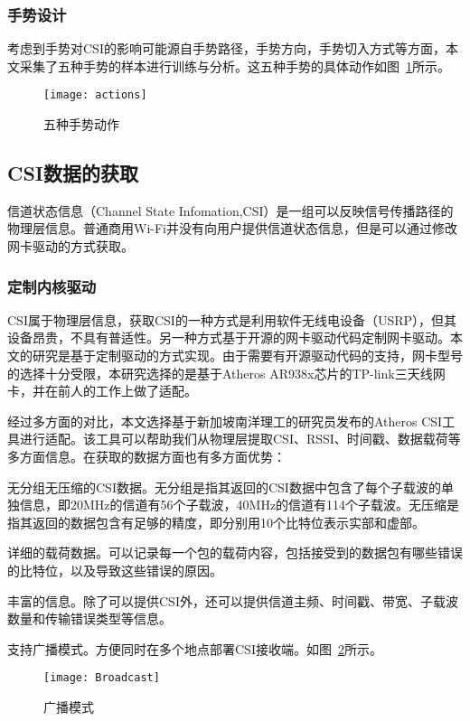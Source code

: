 \subsubsection{手势设计}

考虑到手势对CSI的影响可能源自手势路径，手势方向，手势切入方式等方面，本文采集了五种手势的样本进行训练与分析。这五种手势的具体动作如图~\ref{fig:actions}所示。

\begin{figure}[htbp] %
  \centering
  \texttt{[image: actions]}
  \caption{五种手势动作}
  \label{fig:actions}
\end{figure}

 \subsection{CSI数据的获取}
信道状态信息（Channel State Infomation,CSI）是一组可以反映信号传播路径的物理层信息。普通商用Wi-Fi并没有向用户提供信道状态信息，但是可以通过修改网卡驱动的方式获取。

 \subsubsection{定制内核驱动}
CSI属于物理层信息，获取CSI的一种方式是利用软件无线电设备（USRP），但其设备昂贵，不具有普适性。另一种方式基于开源的网卡驱动代码定制网卡驱动。本文的研究是基于定制驱动的方式实现。由于需要有开源驱动代码的支持，网卡型号的选择十分受限，本研究选择的是基于Atheros AR938x芯片的TP-link三天线网卡，并在前人的工作上做了适配。

经过多方面的对比，本文选择基于新加坡南洋理工的研究员发布的Atheros CSI工具进行适配。该工具可以帮助我们从物理层提取CSI、RSSI、时间戳、数据载荷等多方面信息。在获取的数据方面也有多方面优势：

\begin{compactenum}
\item 无分组无压缩的CSI数据。无分组是指其返回的CSI数据中包含了每个子载波的单独信息，即20MHz的信道有56个子载波，40MHz的信道有114个子载波。无压缩是指其返回的数据包含有足够的精度，即分别用10个比特位表示实部和虚部。
\item 详细的载荷数据。可以记录每一个包的载荷内容，包括接受到的数据包有哪些错误的比特位，以及导致这些错误的原因。
\item 丰富的信息。除了可以提供CSI外，还可以提供信道主频、时间戳、带宽、子载波数量和传输错误类型等信息。
\item 支持广播模式。方便同时在多个地点部署CSI接收端。如图~\ref{fig:Broadcast}所示。
\begin{figure}[htbp] %
  \centering
  \texttt{[image: Broadcast]}
  \caption{广播模式}
  \label{fig:Broadcast}
\end{figure}
\end{compactenum}

